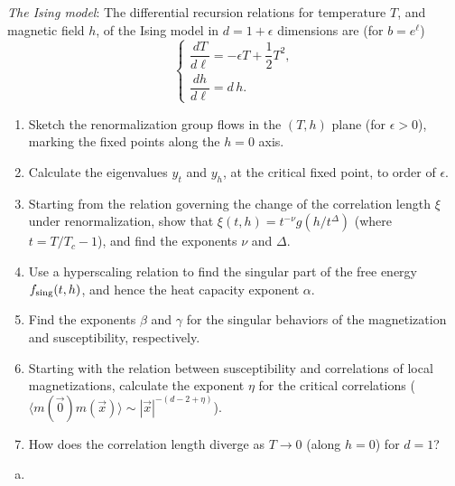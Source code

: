 \begin{problem}
    \textit{The Ising model}: The differential recursion relations for temperature $T$, and magnetic field $h$, of the Ising model in $d = 1 + \epsilon$ dimensions are (for $b = e^\ell$)
    \[
        \begin{cases}
            \dfrac{dT}{d\ell} = -\epsilon T + \dfrac{1}{2}T^2, \\[6pt]
            \dfrac{dh}{d\ell} = d\,h.
        \end{cases}
    \]

    \begin{enumerate}
        \item[(a)] Sketch the renormalization group flows in the $(T,h)$ plane (for $\epsilon > 0$), marking the fixed points along the $h = 0$ axis.

        \item[(b)] Calculate the eigenvalues $y_t$ and $y_h$, at the critical fixed point, to order of $\epsilon$.

        \item[(c)] Starting from the relation governing the change of the correlation length $\xi$ under renormalization, show that $\xi(t,h) = t^{-\nu}g(h/t^\Delta)$ (where $t = T/T_c - 1$), and find the exponents $\nu$ and $\Delta$.

        \item[(d)] Use a hyperscaling relation to find the singular part of the free energy $f_{\rm sing}(t,h)$, and hence the heat capacity exponent $\alpha$.

        \item[(e)] Find the exponents $\beta$ and $\gamma$ for the singular behaviors of the magnetization and susceptibility, respectively.

        \item[(f)] Starting with the relation between susceptibility and correlations of local magnetizations, calculate the exponent $\eta$ for the critical correlations ($\langle m(\vec{0})m(\vec{x})\rangle \sim |\vec{x}|^{-(d-2+\eta)}$).

        \item[(g)] How does the correlation length diverge as $T \to 0$ (along $h = 0$) for $d = 1$?
    \end{enumerate}
\end{problem}

\begin{solution}
    \begin{enumerate}[(a)]
        \item
    \end{enumerate}
\end{solution}

